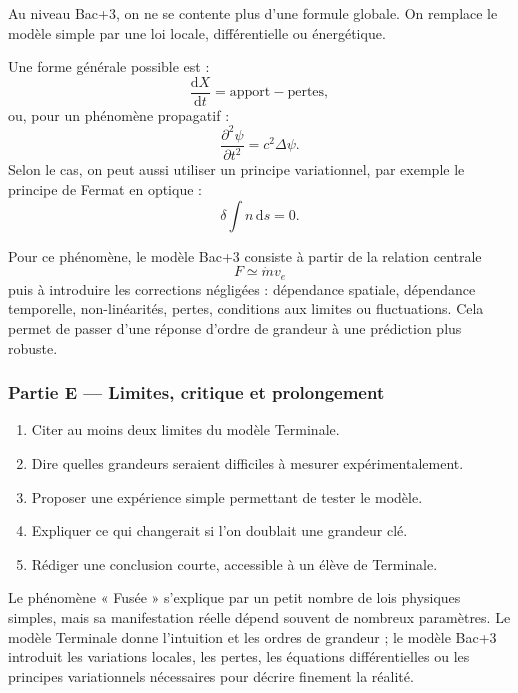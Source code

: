 \documentclass[11pt,a4paper]{article}
\begin{document}
\begin{approfondissementbox}
Au niveau Bac+3, on ne se contente plus d'une formule globale. On remplace le modèle simple par une loi locale, différentielle ou énergétique.

Une forme générale possible est :
\[
\frac{\mathrm d X}{\mathrm dt}=\text{apport}-\text{pertes},
\]
ou, pour un phénomène propagatif :
\[
\frac{\partial^2 \psi}{\partial t^2}=c^2\Delta\psi.
\]
Selon le cas, on peut aussi utiliser un principe variationnel, par exemple le principe de Fermat en optique :
\[
\delta \int n\,\mathrm ds=0.
\]

Pour ce phénomène, le modèle Bac+3 consiste à partir de la relation centrale
\[
F\simeq\dot m v_e
\]
puis à introduire les corrections négligées : dépendance spatiale, dépendance temporelle, non-linéarités, pertes, conditions aux limites ou fluctuations. Cela permet de passer d'une réponse d'ordre de grandeur à une prédiction plus robuste.
\end{approfondissementbox}

\subsubsection*{Partie E — Limites, critique et prolongement}

\begin{enumerate}
  \item Citer au moins deux limites du modèle Terminale.
  \item Dire quelles grandeurs seraient difficiles à mesurer expérimentalement.
  \item Proposer une expérience simple permettant de tester le modèle.
  \item Expliquer ce qui changerait si l'on doublait une grandeur clé.
  \item Rédiger une conclusion courte, accessible à un élève de Terminale.
\end{enumerate}

\begin{corrigebox}
Le phénomène « Fusée » s'explique par un petit nombre de lois physiques simples, mais sa manifestation réelle dépend souvent de nombreux paramètres. Le modèle Terminale donne l'intuition et les ordres de grandeur ; le modèle Bac+3 introduit les variations locales, les pertes, les équations différentielles ou les principes variationnels nécessaires pour décrire finement la réalité.
\end{corrigebox}
\end{document}
